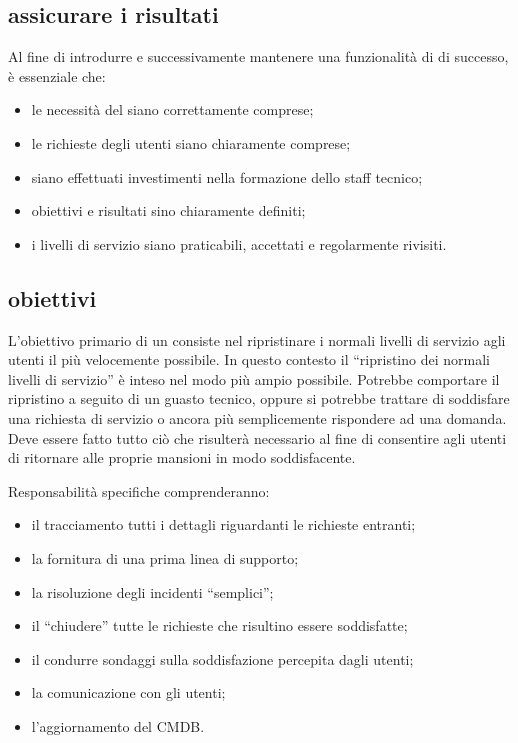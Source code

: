 \subsection[Assicurare i risultati]{assicurare i risultati}
\label{sd-ensuring-results}
Al fine di introdurre e successivamente mantenere una funzionalità di  di successo, è essenziale che:

\begin{itemize}
\item{le necessità del  siano correttamente comprese;}
\item{le richieste degli utenti siano chiaramente comprese;}
\item{siano effettuati investimenti nella formazione dello staff tecnico;}
\item{obiettivi e risultati sino chiaramente definiti;}
\item{i livelli di servizio siano praticabili, accettati e regolarmente rivisiti.}
\end{itemize}

\subsection[Obiettivi]{obiettivi}
\label{sd-objectives}
L'obiettivo primario di un  consiste nel ripristinare i normali livelli di servizio agli utenti il più velocemente possibile. In questo contesto il ``ripristino dei normali livelli di servizio'' è inteso nel modo più ampio possibile. Potrebbe comportare il ripristino a seguito di un guasto tecnico, oppure si potrebbe trattare di soddisfare una richiesta di servizio o ancora più semplicemente rispondere ad una domanda. Deve essere fatto tutto ciò che risulterà necessario al fine di consentire agli utenti di ritornare alle proprie mansioni in modo soddisfacente.

Responsabilità specifiche comprenderanno:

\begin{itemize}
\item{il tracciamento tutti i dettagli riguardanti le richieste entranti;}
\item{la fornitura di una prima linea di supporto;}
\item{la risoluzione degli incidenti ``semplici'';}
\item{il ``chiudere'' tutte le richieste che risultino essere soddisfatte;}
\item{il condurre sondaggi sulla soddisfazione percepita dagli utenti;}
\item{la comunicazione con gli utenti;}
\item{l'aggiornamento del \ac{CMDB}.}
\end{itemize}

